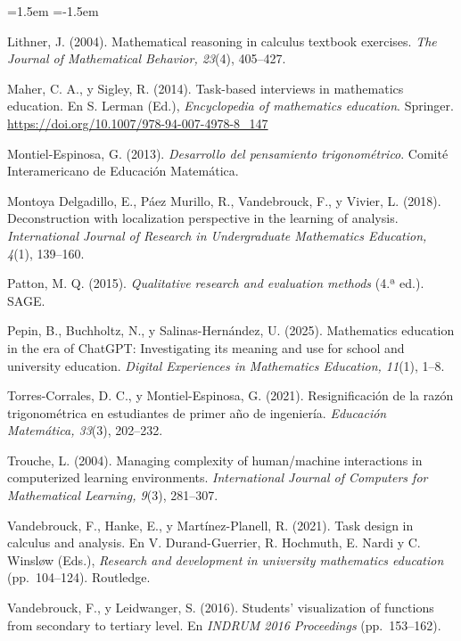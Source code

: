 \documentclass[11pt,letterpaper]{article}
\begin{document}
\begin{list}{}{\leftmargin=1.5em \itemindent=-1.5em \itemsep=3pt \parsep=0pt}
\item Lithner, J. (2004). Mathematical reasoning in calculus textbook exercises. \emph{The Journal of Mathematical Behavior, 23}(4), 405--427.
\item Maher, C. A., y Sigley, R. (2014). Task-based interviews in mathematics education. En S. Lerman (Ed.), \emph{Encyclopedia of mathematics education}. Springer. \url{https://doi.org/10.1007/978-94-007-4978-8_147}
\item Montiel-Espinosa, G. (2013). \emph{Desarrollo del pensamiento trigonométrico}. Comité Interamericano de Educación Matemática.
\item Montoya Delgadillo, E., Páez Murillo, R., Vandebrouck, F., y Vivier, L. (2018). Deconstruction with localization perspective in the learning of analysis. \emph{International Journal of Research in Undergraduate Mathematics Education, 4}(1), 139--160.
\item Patton, M. Q. (2015). \emph{Qualitative research and evaluation methods} (4.ª ed.). SAGE.
\item Pepin, B., Buchholtz, N., y Salinas-Hernández, U. (2025). Mathematics education in the era of ChatGPT: Investigating its meaning and use for school and university education. \emph{Digital Experiences in Mathematics Education, 11}(1), 1--8.
\item Torres-Corrales, D. C., y Montiel-Espinosa, G. (2021). Resignificación de la razón trigonométrica en estudiantes de primer año de ingeniería. \emph{Educación Matemática, 33}(3), 202--232.
\item Trouche, L. (2004). Managing complexity of human/machine interactions in computerized learning environments. \emph{International Journal of Computers for Mathematical Learning, 9}(3), 281--307.
\item Vandebrouck, F., Hanke, E., y Martínez-Planell, R. (2021). Task design in calculus and analysis. En V. Durand-Guerrier, R. Hochmuth, E. Nardi y C. Winsløw (Eds.), \emph{Research and development in university mathematics education} (pp.~104--124). Routledge.
\item Vandebrouck, F., y Leidwanger, S. (2016). Students' visualization of functions from secondary to tertiary level. En \emph{INDRUM 2016 Proceedings} (pp.~153--162).
\end{list}
\end{document}
